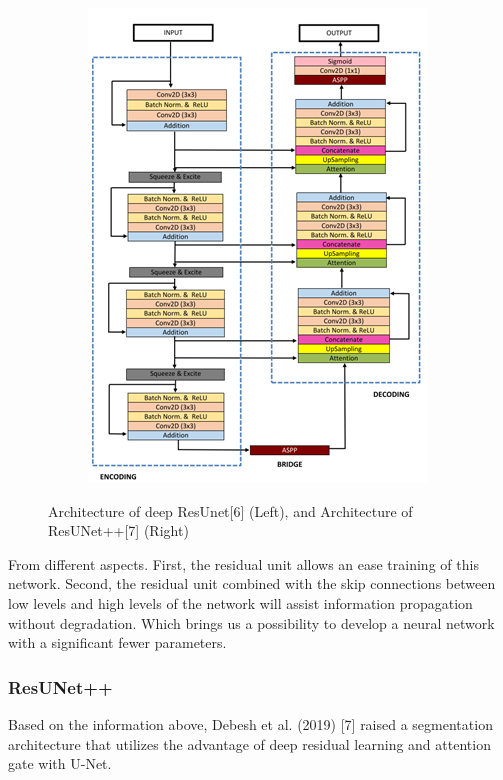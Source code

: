 \documentclass[conference]{IEEEtran}
\begin{document}
\begin{figure}[h]
\begin{subfigure}[t]{0.2\textwidth}
    \end{subfigure}%
    \hfill
    \begin{subfigure}[t]{0.26\textwidth}
        \centering
        \includegraphics[width=\textwidth]{group/Picture7.png}
    \end{subfigure}%
    \caption{Architecture of deep ResUnet[6] (Left), and Architecture of ResUNet++[7] (Right)}
\end{figure}
From different aspects. First, the residual unit allows an ease training of this network. Second, the residual unit combined with the skip connections between low levels and high levels of the network will assist information propagation without degradation. Which brings us a possibility to develop a neural network with a significant fewer parameters.
\subsubsection{ResUNet++}
Based on the information above, Debesh et al. (2019) [7] raised a segmentation architecture that utilizes the advantage of deep residual learning and attention gate with U-Net.
\end{document}
